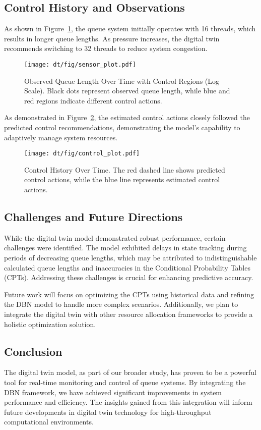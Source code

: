 \subsection{Control History and Observations}

As shown in Figure~\ref{fig:queue_length_sec}, the queue system initially operates with 16 threads, which results in longer queue lengths. As pressure increases, the digital twin recommends switching to 32 threads to reduce system congestion.

\begin{figure}[htbp]
\centering
\texttt{[image: dt/fig/sensor\_plot.pdf]}
\caption{Observed Queue Length Over Time with Control Regions (Log Scale). Black dots represent observed queue length, while blue and red regions indicate different control actions.}
\label{fig:queue_length_sec}
\end{figure}

As demonstrated in Figure~\ref{fig:control_history_sec}, the estimated control actions closely followed the predicted control recommendations, demonstrating the model's capability to adaptively manage system resources.

\begin{figure}[htbp]
\centering
\texttt{[image: dt/fig/control\_plot.pdf]}
\caption{Control History Over Time. The red dashed line shows predicted control actions, while the blue line represents estimated control actions.}
\label{fig:control_history_sec}
\end{figure}

\subsection{Challenges and Future Directions}

While the digital twin model demonstrated robust performance, certain challenges were identified. The model exhibited delays in state tracking during periods of decreasing queue lengths, which may be attributed to indistinguishable calculated queue lengths and inaccuracies in the Conditional Probability Tables (CPTs). Addressing these challenges is crucial for enhancing predictive accuracy.

Future work will focus on optimizing the CPTs using historical data and refining the DBN model to handle more complex scenarios. Additionally, we plan to integrate the digital twin with other resource allocation frameworks to provide a holistic optimization solution.

\subsection{Conclusion}

The digital twin model, as part of our broader study, has proven to be a powerful tool for real-time monitoring and control of queue systems. By integrating the DBN framework, we have achieved significant improvements in system performance and efficiency. The insights gained from this integration will inform future developments in digital twin technology for high-throughput computational environments.
